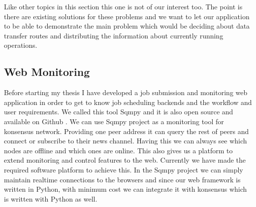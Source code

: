 Like other topics in this section this one is not of our interest too.
The point is there are existing solutions for these problems 
and we want to let our application to be able to demonstrate the main problem which would be 
deciding about data transfer routes and distributing the information about currently running operations.

\subsection{Web Monitoring}
Before starting my thesis I have developed a job submission and monitoring web application in order to get to know 
job scheduling backends and the workflow and user requirements. We called this tool Sqmpy and it is also open source and
available on Github \cite{sqmpy}. We can use Sqmpy project as a monitoring tool for konsensus network.
Providing one peer address it can query the rest of peers and connect or 
subscribe to their news channel. Having this we can always see which nodes are
offline and which ones are online. This also gives us a platform to extend
monitoring and control features to the web. Currently we have made the 
required software platform to achieve this. In the Sqmpy project we can simply maintain realtime connections to the browsers and since
our web framework is written in Python, with minimum cost we can integrate it with konsensus which is written with Python as well.
